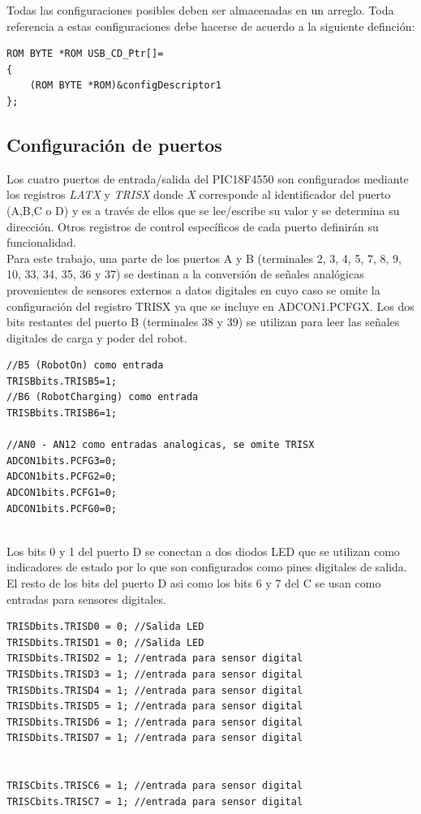 \documentclass[letterpaper,openright,12pt]{book}
\begin{document}
Todas las configuraciones posibles deben ser almacenadas en un arreglo. Toda referencia a estas configuraciones debe hacerse de acuerdo a la siguiente definción:
\begin{lstlisting}
ROM BYTE *ROM USB_CD_Ptr[]=
{
    (ROM BYTE *ROM)&configDescriptor1
};
\end{lstlisting}
\subsection{Configuración de puertos}
Los cuatro puertos de entrada/salida del PIC18F4550 son configurados mediante los registros \emph{LATX} y \emph{TRISX} donde \emph{X} corresponde al identificador del puerto (A,B,C o D) y es a través de ellos que se lee/escribe su valor y se determina su dirección. Otros registros de control específicos de cada puerto definirán su funcionalidad.\\
Para este trabajo, una parte de los puertos A y B (terminales 2, 3, 4, 5, 7, 8, 9, 10, 33, 34, 35, 36 y 37) se destinan a la conversión de señales analógicas provenientes de sensores externos a datos digitales en cuyo caso se omite la configuración del registro TRISX ya que se incluye en ADCON1.PCFGX. Los dos bits restantes del puerto B (terminales 38 y 39) se utilizan para leer las señales digitales de carga y poder del robot.

\begin{lstlisting}
//B5 (RobotOn) como entrada
TRISBbits.TRISB5=1;
//B6 (RobotCharging) como entrada
TRISBbits.TRISB6=1;

//AN0 - AN12 como entradas analogicas, se omite TRISX
ADCON1bits.PCFG3=0;
ADCON1bits.PCFG2=0;
ADCON1bits.PCFG1=0;
ADCON1bits.PCFG0=0;


\end{lstlisting}

Los bits 0 y 1 del puerto D se conectan a dos diodos LED que se utilizan como indicadores de estado por lo que son configurados como pines digitales de salida. El resto de los bits del puerto D asi como los bits 6 y 7 del C se usan como entradas para sensores digitales.

\begin{lstlisting}
TRISDbits.TRISD0 = 0; //Salida LED
TRISDbits.TRISD1 = 0; //Salida LED
TRISDbits.TRISD2 = 1; //entrada para sensor digital
TRISDbits.TRISD3 = 1; //entrada para sensor digital
TRISDbits.TRISD4 = 1; //entrada para sensor digital
TRISDbits.TRISD5 = 1; //entrada para sensor digital
TRISDbits.TRISD6 = 1; //entrada para sensor digital
TRISDbits.TRISD7 = 1; //entrada para sensor digital
	

TRISCbits.TRISC6 = 1; //entrada para sensor digital
TRISCbits.TRISC7 = 1; //entrada para sensor digital
\end{lstlisting}
\end{document}
